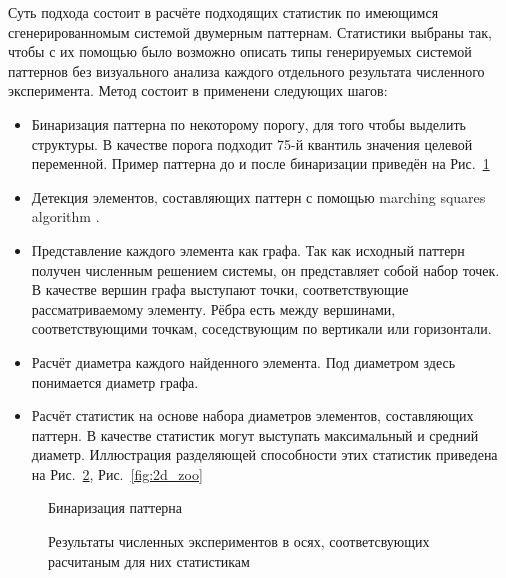 Суть подхода состоит в расчёте подходящих статистик по имеющимся сгенерированномым системой двумерным паттернам. Статистики выбраны так, чтобы с их помощью было возможно описать типы генерируемых системой паттернов без визуального анализа каждого отдельного результата численного эксперимента. Метод состоит в применени следующих шагов:
\begin{itemize}
    \item Бинаризация паттерна по некоторому порогу, для того чтобы выделить структуры. В качестве порога подходит 75-й квантиль значения целевой переменной. Пример паттерна до и после бинаризации приведён на Рис.~\ref{fig:2d_patt_bin}
    \item Детекция элементов, составляющих паттерн с помощью marching squares algorithm \cite{we1987marching}.
    \item Представление каждого элемента как графа. Так как исходный паттерн получен численным решением системы, он представляет собой набор точек. В качестве вершин графа выступают точки, соответствующие рассматриваемому элементу. Рёбра есть между вершинами, соответствующими точкам, соседствующим по вертикали или горизонтали. 
    \item Расчёт диаметра каждого найденного элемента. Под диаметром здесь понимается диаметр графа.
    \item Расчёт статистик на основе набора диаметров элементов, составляющих паттерн. В качестве статистик могут выступать максимальный и средний диаметр. Иллюстрация разделяющей способности этих статистик приведена на Рис.~\ref{fig:2d_stats}, Рис.~\ref{fig:2d_zoo} 
\end{itemize}

\begin{figure}[ht]
    \caption{Бинаризация паттерна}\label{fig:2d_patt_bin}
\end{figure}

\begin{figure}[ht]
    \caption{Результаты численных экспериментов в осях, соответсвующих расчитаным для них статистикам}\label{fig:2d_stats}
\end{figure}

